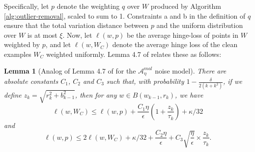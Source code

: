 \documentclass[11pt]{article}
\newtheorem{lemma}[theorem]{Lemma}
\newcommand{\0}{\mathbf{0}}
\newcommand{\1}{\mathbf{1}}
\newcommand{\cA}{\mathcal{A}}
\begin{document}
Specifically, let $p$ denote the weighting $q$ over $W$ produced by Algorithm \ref{alg:outlier-removal}, scaled to sum to 1.  Constraints a and b in the definition of $q$ ensure that the total variation distance between $p$ and the uniform distribution over $W$ is at most $\xi$.  Now, let $\ell(w,p)$ be the average hinge-loss of points in $W$ weighted by $p$, and let $\ell(w,W_C)$ denote the average hinge loss of the clean examples $W_C$ weighted uniformly.  Lemma 4.7 of \cite{awasthi2017power} relates these as follows:

\setcounter{equation}{7}
\begin{lemma}[Analog of Lemma 4.7 of \cite{awasthi2017power} for the $\cA^{mal}_\eta$ noise model]
\label{lemma:clean.vs.filtered.lc}
There are absolute constants $C_1$, $C_2$ and $C_3$ such that,
with probability $1 - \frac{\delta}{2 (k+k^2)}$,
if we define $z_k = \sqrt{r_k^2 + {b^2_{k-1}}}$, then
for any $w \in B({w}_{k-1},r_k)$, we have
\begin{equation}
\label{e:clean.by.filtered}
\ell(w, W_C)
\leq \ell(w,p)
        + \frac{C_1 \eta}{\epsilon}
    \left(1 + \frac{z_k}{\tau_k}
                        \right) + \kappa/32
\end{equation}
and
\begin{equation}
\label{e:filtered.by.clean}
\ell(w,p)
  \leq 2 \ell(w,W_C)
        + \kappa/32
        +  \frac{C_2 \eta}{\epsilon}
        + C_3 \sqrt{\frac{\eta}{\epsilon}} \times \frac{z_k}{\tau_k}.
\end{equation}
\end{lemma}
\end{document}
